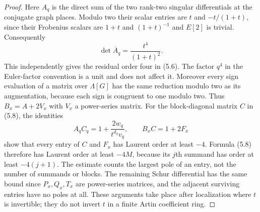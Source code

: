 \documentclass[11pt]{article}
\theoremstyle{definition}
\theoremstyle{remark}
\begin{document}
\begin{proof}
Here $A_q$ is the direct sum of the two rank-two singular
differentials at the conjugate graph places. Modulo two their
scalar entries are $t$ and $-t/(1+t)$, since their Frobenius
scalars are $1+t$ and $(1+t)^{-1}$ and $E[2]$ is trivial.
Consequently
\[
                  \det\overline A_q=\frac{t^4}{(1+t)^2}.
\]
This independently gives the residual order four in (5.6).
The factor $q^4$ in the Euler-factor convention is a unit and
does not affect it. Moreover every sign evaluation of a matrix
over $\Lambda[G]$ has the same reduction modulo two as its
augmentation, because each sign is congruent to one modulo two.
Thus $B_x=A+2V_x$ with $V_x$ a power-series matrix. For the
block-diagonal matrix $C$ in (5.8), the identities
\[
 A_q C_q=1+\frac{2w_q}{t^{d_q}v_q},\qquad
 B_xC=1+2F_x
\]
show that every entry of $C$ and $F_x$ has Laurent order at
least $-4$. Formula (5.8) therefore has Laurent order at least
$-4M$, because its $j$th summand has order at least $-4(j+1)$.
The estimate counts the largest pole of an entry, not the number
of summands or blocks. The remaining Schur differential has the
same bound since $P_x,Q_x,T_x$ are power-series matrices, and
the adjacent surviving entries have no poles at all. These
arguments take place after localization where $t$ is invertible;
they do not invert $t$ in a finite Artin coefficient ring.
\end{proof}
\end{document}
